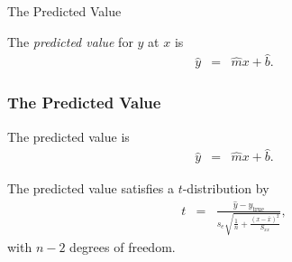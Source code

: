 \begin{frame}{The Predicted Value}

  \begin{definition}
    The \textit{predicted value} for $y$ at $x$ is
    \begin{eqnarray*}
      \hat{y} & = & \hat{m} x + \hat{b}.
    \end{eqnarray*}
  \end{definition}




  
\end{frame}

\begin{frame}
  \frametitle{The Predicted Value}

  The predicted value is 
  \begin{eqnarray*}
    \hat{y} & = & \hat{m} x + \hat{b}.
  \end{eqnarray*}


  The predicted value  satisfies a $t$-distribution by
  \begin{eqnarray*}
    t & = & \frac{\hat{y}-y_{\mathrm{true}}}{s_e \sqrt{\frac{1}{n}+\frac{(x-\bar{x})^2}{S_{xx}}}},
  \end{eqnarray*}
  with $n-2$ degrees of freedom.

\end{frame}


